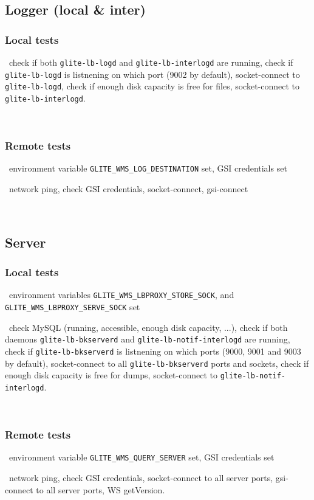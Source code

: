 \subsection{Logger (local \& inter)}

\subsubsection{Local tests}
\what\ check if both \texttt{glite-lb-logd} and \texttt{glite-lb-interlogd} are running,
check if \texttt{glite-lb-logd} is listnening on which port (9002 by default),
socket-connect to \texttt{glite-lb-logd},
check if enough disk capacity is free for  files,
socket-connect to \texttt{glite-lb-interlogd}.

\how\ 


\subsubsection{Remote tests}
\req\ environment variable \texttt{GLITE\_WMS\_LOG\_DESTINATION} set, GSI credentials set

\what\ network ping,
check GSI credentials,
socket-connect,
gsi-connect

\how\ 


\subsection{Server}

\subsubsection{Local tests}
\req\ environment variables \texttt{GLITE\_WMS\_LBPROXY\_STORE\_SOCK},
and \texttt{GLITE\_WMS\_LBPROXY\_SERVE\_SOCK} set

\what\ check MySQL (running, accessible, enough disk capacity, ...),
check if both daemons \texttt{glite-lb-bkserverd} and \texttt{glite-lb-notif-interlogd} are running,
check if \texttt{glite-lb-bkserverd} is listnening on which ports (9000, 9001 and 9003 by default),
socket-connect to all \texttt{glite-lb-bkserverd} ports and sockets,
check if enough disk capacity is free for dumps,
socket-connect to \texttt{glite-lb-notif-interlogd}.

\how\ 


\subsubsection{Remote tests}
\req\ environment variable \texttt{GLITE\_WMS\_QUERY\_SERVER} set, GSI credentials set

\what\ network ping,
check GSI credentials,
socket-connect to all server ports,
gsi-connect to all server ports,
WS getVersion.

\how\ 



